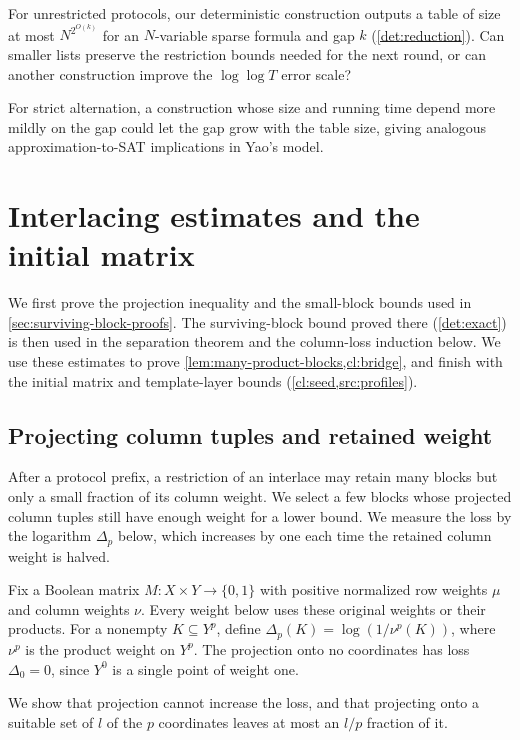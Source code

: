 \documentclass[11pt,letterpaper]{article} \usepackage[utf8]{inputenc}
\theoremstyle{plain} \newtheorem{theorem}{Theorem}[section]
\theoremstyle{definition} \newaliascnt{definition}{theorem}
\begin{document}
For unrestricted protocols, our deterministic construction outputs a table
of size at most $N^{2^{O(k)}}$ for an $N$-variable sparse formula and gap $k$
(\cref{det:reduction}). Can smaller lists preserve the restriction bounds needed for the
next round, or can another construction improve the $\log\log T$ error scale?

For strict alternation, a construction whose size and running time depend
more mildly on the gap could let the gap grow with the table size, giving
analogous approximation-to-SAT implications in Yao's model.


\appendix
\section{Interlacing estimates and the initial matrix}\label{sec:interlacing-details}
\label{sec:interlacing_details}

We first prove the projection inequality and the small-block bounds used in
\cref{sec:surviving-block-proofs}. The surviving-block bound proved there
(\cref{det:exact}) is then used in the separation theorem and the column-loss induction below.
We use these estimates to prove \cref{lem:many-product-blocks,cl:bridge},
and finish with the initial matrix and template-layer bounds
(\cref{cl:seed,src:profiles}).

\subsection{Projecting column tuples and retained weight}

After a protocol prefix, a restriction of an interlace may retain many blocks
but only a small fraction of its column weight. We select a few blocks whose
projected column tuples still have enough weight for a lower bound. We measure the
loss by the logarithm $\Delta_p$ below, which increases by one each time the
retained column weight is halved.

Fix a Boolean matrix $M:X\times Y\to\{0,1\}$ with positive normalized row weights $\mu$ and
column weights $\nu$. Every weight below uses these original weights or their products.
For a nonempty $K\subseteq Y^p$, define
$\Delta_p(K)=\log(1/\nu^p(K))$, where $\nu^p$ is the product weight on $Y^p$. The projection onto no coordinates has loss $\Delta_0=0$, since $Y^0$ is
a single point of weight one.

We show that projection cannot increase the loss, and that projecting onto a
suitable set of $l$ of the $p$ coordinates leaves at most an $l/p$ fraction of it.
\end{document}
